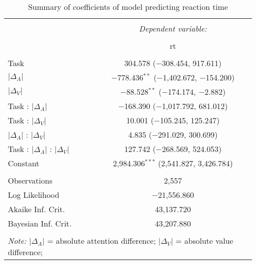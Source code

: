 
\begin{table}[t] \centering 
  \caption{Summary of coefficients of model predicting reaction time} 
  \label{table:rtModel} 
\begin{tabular}{@{\extracolsep{5pt}}lc} 
\\[-1.8ex]\hline 
\hline \\[-1.8ex] 
 & \multicolumn{1}{c}{\textit{Dependent variable:}} \\ 
\cline{2-2} 
\\[-1.8ex] & rt \\ 
\hline \\[-1.8ex] 
 Task & 304.578 ($-$308.454, 917.611) \\ 
  $\vert\Delta_A\vert$ & $-$778.436$^{**}$ ($-$1,402.672, $-$154.200) \\ 
  $\vert\Delta_V\vert$ & $-$88.528$^{**}$ ($-$174.174, $-$2.882) \\ 
  Task : $\vert\Delta_A\vert$ & $-$168.390 ($-$1,017.792, 681.012) \\ 
  Task : $\vert\Delta_V\vert$ & 10.001 ($-$105.245, 125.247) \\ 
  $\vert\Delta_A\vert$ : $\vert\Delta_V\vert$ & 4.835 ($-$291.029, 300.699) \\ 
  Task : $\vert\Delta_A\vert$ :  $\vert\Delta_V\vert$ & 127.742 ($-$268.569, 524.053) \\ 
  Constant & 2,984.306$^{***}$ (2,541.827, 3,426.784) \\ 
 \hline \\[-1.8ex] 
Observations & 2,557 \\ 
Log Likelihood & $-$21,556.860 \\ 
Akaike Inf. Crit. & 43,137.720 \\ 
Bayesian Inf. Crit. & 43,207.880 \\ 
\hline 
\hline \\[-1.8ex] 
\multicolumn{2}{l}{\footnotesize \textit{Note:} $\vert\Delta_A\vert$ = absolute attention difference; $\vert\Delta_V\vert$ = absolute value difference; } \\ 
\end{tabular} 
\end{table} 
